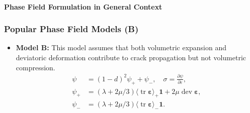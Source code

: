 \documentclass{beamer}
\newcommand{\SectionTwo}{Phase Field Formulation in General Context}
\DeclareMathOperator{\dev}{dev}
\DeclareMathOperator{\trace}{tr}
\let\cite\shortcite
\begin{document}
\begin{frame}[label=subinc]
	\framesubtitle{\SectionTwo}
	\frametitle{Popular Phase Field Models (B)}
	\begin{itemize}
		\setlength\itemsep{2em}
		\item \textbf{Model B:} This model assumes that both volumetric expansion and deviatoric deformation contribute to crack propagation but not volumetric compression. \cite{Amor09}
		\begin{align*}
		\psi&=(1-d)^2\psi_{+} + \psi_{-},\quad\sigma=\frac{\partial\psi}{\partial\varepsilon}, \\
		\psi_+&=(\lambda+2\mu/3)\langle \trace \bm{\varepsilon} \rangle_+\bm{1} + 2\mu\dev\bm{\varepsilon},\\
		\psi_-&=(\lambda+2\mu/3)\langle \trace \bm{\varepsilon} \rangle_-\bm{1}.
		\end{align*}
	\end{itemize}
	\hyperlink{RegVarInc}{}
\end{frame}
\end{document}
